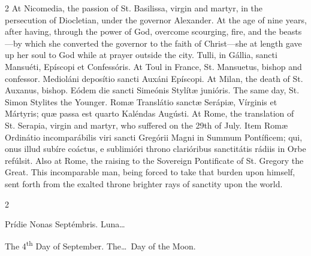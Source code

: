 \begin{paracol}{2}
At Nicomedia, the passion of St. 
 Basilissa, virgin and martyr, in the persecution of Diocletian, under the 
 governor Alexander. At the age of nine years, after having, through 
 the power of God, overcome scourging, fire, and the beasts—by which she 
 converted the governor to the faith of Christ—she at length gave up her soul 
 to God while at prayer outside the city.
\switchcolumn*
{}
Tulli, in Gállia, 
 sancti Mansuéti, Epíscopi et Confessóris.
\switchcolumn
{}
At Toul in France, St. Mansuetus, 
 bishop and confessor.
\switchcolumn*
{}
Medioláni deposítio 
 sancti Auxáni Epíscopi.
\switchcolumn
{}
At Milan, the death of St. Auxanus, 
 bishop.
\switchcolumn*
{}
Eódem die sancti 
 Simeónis Stylítæ junióris.
\switchcolumn
{}
The same day, St. Simon Stylites the 
 Younger.
\switchcolumn*
{}
Romæ Translátio sanctæ 
 Serápiæ, Vírginis et Mártyris; quæ passa est quarto Kaléndas Augústi.
\switchcolumn
{}
At Rome, the translation of St. 
 Serapia, virgin and martyr, who suffered on the 29th of July.
\switchcolumn*
{}
Item Romæ Ordinátio 
 incomparábilis viri sancti Gregórii Magni in Summum Pontíficem; qui, onus 
 illud subíre coáctus, e sublimióri throno clarióribus sanctitátis rádiis in 
 Orbe refúlsit.
\switchcolumn
{}
Also at Rome, the raising to the 
 Sovereign Pontificate of St. Gregory the Great. This incomparable man, 
 being forced to take that burden upon himself, sent forth from the exalted 
 throne brighter rays of sanctity upon the world.
\switchcolumn*
{}
\end{paracol}


\begin{paracol}{2}
\begin{center}{\color{gregoriocolor} Prídie Nonas Septémbris. 
 Luna\dots\ }\end{center}
\switchcolumn
{}
\begin{center}{\color{gregoriocolor} The   4\textsuperscript{th} Day of 
 September. The\dots\ Day of the Moon.}\end{center}
\end{paracol}

